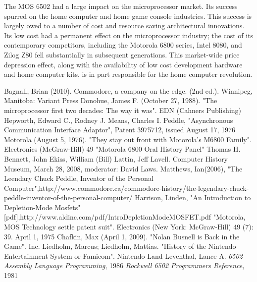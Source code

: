 \documentclass[journal]{IEEEtran}
\begin{document}
The MOS 6502 had a large impact on the microprocessor market. Its success
spurred on the home computer and home game console industries. This success is
largely owed to a number of cost and resource saving architectural innovations.
Its low cost had a permanent effect on the microprocessor industry; the cost of
its contemporary competitors, including the Motorola 6800 series, Intel 8080,
and Zilog Z80 fell substantially in subsequent generations. This market-wide
price depression effect, along with the availability of low cost development
hardware and home computer kits, is in part responsible for the home computer
revolution.

\begin{thebibliography}{1}

Bagnall, Brian (2010). Commodore, a company on the edge. (2nd ed.). Winnipeg, Manitoba: Variant Press
Donohue, James F. (October 27, 1988). "The microprocessor first two decades: The way it was". EDN (Cahners Publishing) 
Hepworth, Edward C., Rodney J. Means, Charles I. Peddle, "Asynchronous Communication Interface Adaptor", Patent 3975712, issued August 17, 1976
Motorola (August 5, 1976). "They stay out front with Motorola's M6800 Family". Electronics (McGraw-Hill) 49
"Motorola 6800 Oral History Panel" Thomas H. Bennett, John Ekiss, William (Bill) Lattin, Jeff Lavell. Computer History Museum, March 28, 2008, moderator: David Laws.
Matthews, Ian(2006), "The Leendary Chuck Peddle, Inventor of the Personal Computer",http://www.commodore.ca/commodore-history/the-legendary-chuck-peddle-inventor-of-the-personal-computer/
Harrison, Linden, "An Introduction to Depletion-Mode Mosfets"[pdf],http://www.aldinc.com/pdf/IntroDepletionModeMOSFET.pdf
"Motorola, MOS Technology settle patent suit". Electronics (New York: McGraw-Hill) 49 (7): 39. April 1, 1975
Chafkin, Max (April 1, 2009). "Nolan Busnell is Back in the Game". Inc.
Liedholm, Marcus; Liedholm, Mattias. "History of the Nintendo Entertainment System or Famicom". Nintendo Land
Leventhal, Lance A. \emph{6502 Assembly Language Programming}, 1986
\emph{Rockwell 6502 Programmers Reference}, 1981


\end{thebibliography}
\end{document}
